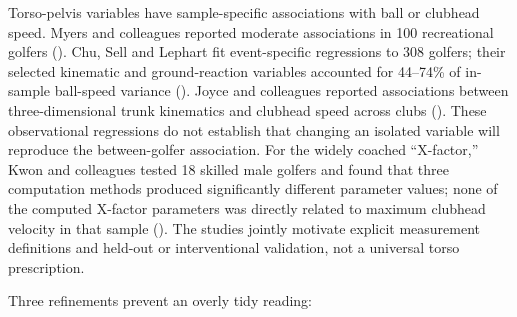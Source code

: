 \documentclass[
  letterpaper,
]{report}
\begin{document}
Torso-pelvis variables have sample-specific associations with ball or
clubhead speed. Myers and colleagues reported moderate associations in
100 recreational golfers ().
Chu, Sell and Lephart fit event-specific regressions to 308 golfers;
their selected kinematic and ground-reaction variables accounted for
44--74\% of in-sample ball-speed variance (). Joyce and colleagues reported associations
between three-dimensional trunk kinematics and clubhead speed across
clubs (). These observational
regressions do not establish that changing an isolated variable will
reproduce the between-golfer association. For the widely coached
``X-factor,'' Kwon and colleagues tested 18 skilled male golfers and
found that three computation methods produced significantly different
parameter values; none of the computed X-factor parameters was directly
related to maximum clubhead velocity in that sample
(). The studies jointly
motivate explicit measurement definitions and held-out or interventional
validation, not a universal torso prescription.

Three refinements prevent an overly tidy reading:
\end{document}
